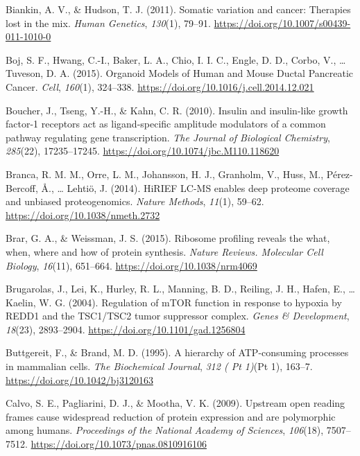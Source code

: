 \documentclass[12pt,openany]{book}
\begin{document}
\hypertarget{ref-Biankin2011}{}
Biankin, A. V., \& Hudson, T. J. (2011). Somatic variation and cancer:
Therapies lost in the mix. \emph{Human Genetics}, \emph{130}(1), 79--91.
\url{https://doi.org/10.1007/s00439-011-1010-0}

\hypertarget{ref-Boj2015}{}
Boj, S. F., Hwang, C.-I., Baker, L. A., Chio, I. I. C., Engle, D. D.,
Corbo, V., \ldots{} Tuveson, D. A. (2015). Organoid Models of Human and
Mouse Ductal Pancreatic Cancer. \emph{Cell}, \emph{160}(1), 324--338.
\url{https://doi.org/10.1016/j.cell.2014.12.021}

\hypertarget{ref-Boucher2010}{}
Boucher, J., Tseng, Y.-H., \& Kahn, C. R. (2010). Insulin and
insulin-like growth factor-1 receptors act as ligand-specific amplitude
modulators of a common pathway regulating gene transcription. \emph{The
Journal of Biological Chemistry}, \emph{285}(22), 17235--17245.
\url{https://doi.org/10.1074/jbc.M110.118620}

\hypertarget{ref-Branca2014}{}
Branca, R. M. M., Orre, L. M., Johansson, H. J., Granholm, V., Huss, M.,
Pérez-Bercoff, Å., \ldots{} Lehtiö, J. (2014). HiRIEF LC-MS enables deep
proteome coverage and unbiased proteogenomics. \emph{Nature Methods},
\emph{11}(1), 59--62. \url{https://doi.org/10.1038/nmeth.2732}

\hypertarget{ref-Brar2015}{}
Brar, G. A., \& Weissman, J. S. (2015). Ribosome profiling reveals the
what, when, where and how of protein synthesis. \emph{Nature Reviews.
Molecular Cell Biology}, \emph{16}(11), 651--664.
\url{https://doi.org/10.1038/nrm4069}

\hypertarget{ref-Brugarolas2004}{}
Brugarolas, J., Lei, K., Hurley, R. L., Manning, B. D., Reiling, J. H.,
Hafen, E., \ldots{} Kaelin, W. G. (2004). Regulation of mTOR function in
response to hypoxia by REDD1 and the TSC1/TSC2 tumor suppressor complex.
\emph{Genes \& Development}, \emph{18}(23), 2893--2904.
\url{https://doi.org/10.1101/gad.1256804}

\hypertarget{ref-Buttgereit1995}{}
Buttgereit, F., \& Brand, M. D. (1995). A hierarchy of ATP-consuming
processes in mammalian cells. \emph{The Biochemical Journal}, \emph{312
( Pt 1)}(Pt 1), 163--7. \url{https://doi.org/10.1042/bj3120163}

\hypertarget{ref-Calvo2009}{}
Calvo, S. E., Pagliarini, D. J., \& Mootha, V. K. (2009). Upstream open
reading frames cause widespread reduction of protein expression and are
polymorphic among humans. \emph{Proceedings of the National Academy of
Sciences}, \emph{106}(18), 7507--7512.
\url{https://doi.org/10.1073/pnas.0810916106}
\end{document}
